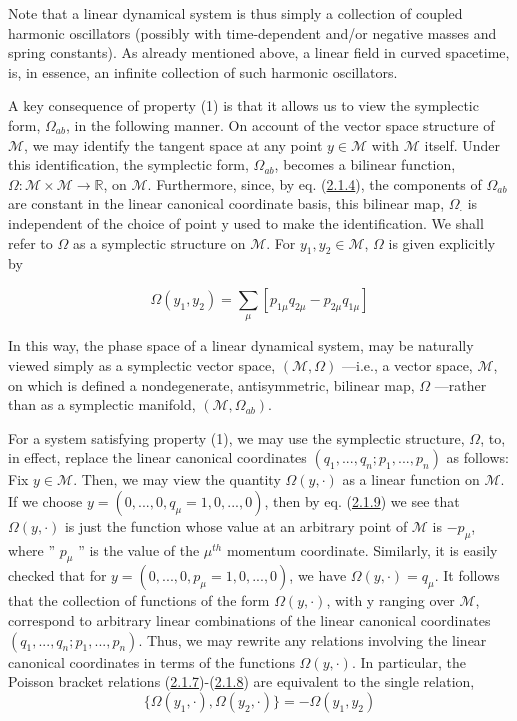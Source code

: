 \documentclass[11pt,a4paper]{article}
\begin{document}
Note that a linear dynamical system is thus simply a collection of coupled harmonic oscillators (possibly with time-dependent and/or negative masses and spring constants). As already mentioned above, a linear field in curved spacetime, is, in essence, an infinite collection of such harmonic oscillators.

A key consequence of property (1) is that it allows us to view the symplectic form, \(\Omega_{ab}\), in the following manner. On account of the vector space structure of \(\mathcal{M}\), we may identify the tangent space at any point \(y\in\mathcal{M}\) with \(\mathcal{M}\) itself. Under this identification, the symplectic form, \(\Omega_{ab}\), becomes a bilinear function, \(\Omega\colon \mathcal{M}\times \mathcal{M}\to \mathbb{R}\), on \(\mathcal{M}\). Furthermore, since, by eq. (\hyperref[eq:2.1.4]{2.1.4}), the components of \(\Omega_{ab}\) are constant in the linear canonical coordinate basis, this bilinear map, \(\Omega_{\cdot}\) is independent of the choice of point y used to make the identification. We shall refer to \(\Omega\) as a symplectic structure on \(\mathcal{M}\). For \(y_1,y_2\in \mathcal{M}\), \(\Omega\) is given explicitly by

\hypertarget{source-28}{}
\begin{equation*}
\Omega(y_1, y_2) = \sum_{\mu} [p_{1\mu} q_{2\mu} - p_{2\mu} q_{1\mu}] \tag{2.1.9}\label{eq:2.1.9}
\end{equation*}

In this way, the phase space of a linear dynamical system, may be naturally viewed simply as a symplectic vector space, \((\mathcal{M}, \Omega)\) ---i.e., a vector space, \(\mathcal{M}\), on which is defined a nondegenerate, antisymmetric, bilinear map, \(\Omega\) ---rather than as a symplectic manifold, \((\mathcal{M}, \Omega_{ab})\).

For a system satisfying property (1), we may use the symplectic structure, \(\Omega\), to, in effect, replace the linear canonical coordinates \((q_1,...,q_n; p_1,...,p_n)\) as follows: Fix \(y\in\mathcal{M}\). Then, we may view the quantity \(\Omega(y,\cdot)\) as a linear function on \(\mathcal{M}\). If we choose \(y=(0,...,0, q_\mu=1,0,...,0)\), then by eq. (\hyperref[eq:2.1.9]{2.1.9}) we see that \(\Omega(y,\cdot)\) is just the function whose value at an arbitrary point of \(\mathcal{M}\) is \(-p_\mu\), where '' \(p_\mu\) '' is the value of the \(\mu^{th}\) momentum coordinate. Similarly, it is easily checked that for \(y=(0,...,0, p_\mu=1,0,...,0)\), we have \(\Omega(y,\cdot)=q_\mu\). It follows that the collection of functions of the form \(\Omega(y,\cdot)\), with y ranging over \(\mathcal{M}\), correspond to arbitrary linear combinations of the linear canonical coordinates \((q_1,...,q_n; p_1,...,p_n)\). Thus, we may rewrite any relations involving the linear canonical coordinates in terms of the functions \(\Omega(y,\cdot)\). In particular, the Poisson bracket relations (\hyperref[eq:2.1.7]{2.1.7})-(\hyperref[eq:2.1.8]{2.1.8}) are equivalent to the single relation,
\begin{equation*}
\{\Omega(y_1,\cdot), \Omega(y_2,\cdot)\} = -\Omega(y_1, y_2) \tag{2.1.10}\label{eq:2.1.10}
\end{equation*}
\end{document}
